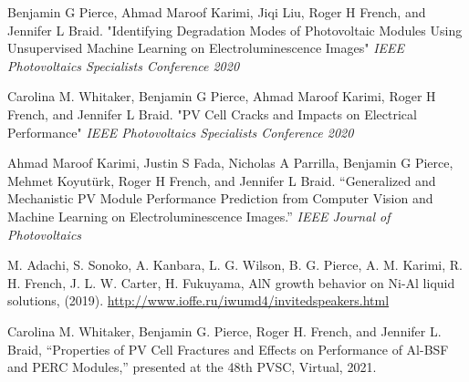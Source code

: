 \documentclass[10pt]{article}
\begin{document}
	{\begin{newitemize}
		\item{{ Benjamin G Pierce}, Ahmad Maroof Karimi, Jiqi Liu, Roger H French, and Jennifer L Braid. "Identifying Degradation Modes  of Photovoltaic Modules Using Unsupervised Machine Learning on Electroluminescence Images" \textit{IEEE Photovoltaics Specialists Conference 2020}}
		\item{Carolina M. Whitaker, { Benjamin G Pierce}, Ahmad Maroof Karimi, Roger H French, and Jennifer L Braid. "PV Cell Cracks and Impacts on Electrical Performance" \textit{IEEE Photovoltaics Specialists Conference 2020}}
		\item{Ahmad Maroof Karimi, Justin S Fada, Nicholas A Parrilla, { Benjamin G Pierce}, Mehmet Koyutürk, Roger H French, and Jennifer L Braid. “Generalized and Mechanistic PV Module Performance Prediction from Computer Vision and Machine Learning on Electroluminescence Images.” \textit{IEEE Journal of Photovoltaics} }
		\item{M. Adachi, S. Sonoko, A. Kanbara, L. G. Wilson, {B. G. Pierce}, A. M. Karimi, R. H. French, J. L. W. Carter, H. Fukuyama, AlN growth behavior on Ni-Al liquid solutions, (2019). \href{http://www.ioffe.ru/iwumd4/invitedspeakers.html}{http://www.ioffe.ru/iwumd4/invitedspeakers.html} }
        \item {Carolina M. Whitaker, { Benjamin G. Pierce}, Roger H. French, and Jennifer L. Braid, “Properties of PV Cell Fractures and Effects on Performance of Al-BSF and PERC Modules,” presented at the 48th PVSC, Virtual, 2021.
}
\end{newitemize}}
\end{document}
